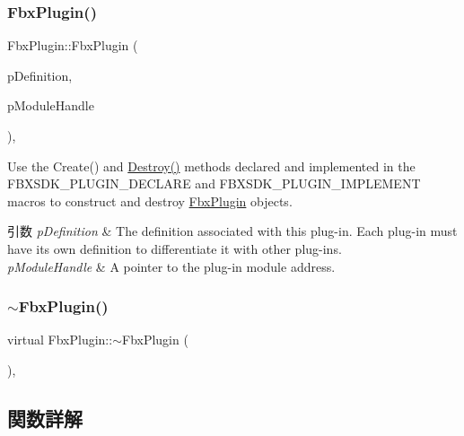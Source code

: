 \subsubsection{\texorpdfstring{Fbx\+Plugin()}{FbxPlugin()}}
{\footnotesize\ttfamily Fbx\+Plugin\+::\+Fbx\+Plugin (\begin{DoxyParamCaption}\item[{const \hyperlink{struct_fbx_plugin_def}{Fbx\+Plugin\+Def} \&}]{p\+Definition,  }\item[{\hyperlink{fbxmodule_8h_a1d2ed3e9ccb8075d585f7cb7bdf40420}{Fbx\+Module}}]{p\+Module\+Handle }\end{DoxyParamCaption})\hspace{0.3cm}{\ttfamily [explicit]}, {\ttfamily [protected]}}

Use the Create() and \hyperlink{class_fbx_plugin_a0a3b33c932cc862e539cef85d168b86a}{Destroy()} methods declared and implemented in the F\+B\+X\+S\+D\+K\+\_\+\+P\+L\+U\+G\+I\+N\+\_\+\+D\+E\+C\+L\+A\+RE and F\+B\+X\+S\+D\+K\+\_\+\+P\+L\+U\+G\+I\+N\+\_\+\+I\+M\+P\+L\+E\+M\+E\+NT macros to construct and destroy \hyperlink{class_fbx_plugin}{Fbx\+Plugin} objects. 
\begin{DoxyParams}{引数}
{\em p\+Definition} & The definition associated with this plug-\/in. Each plug-\/in must have its own definition to differentiate it with other plug-\/ins. \\
\hline
{\em p\+Module\+Handle} & A pointer to the plug-\/in module address. \\
\hline
\end{DoxyParams}
\mbox{\label{class_fbx_plugin_ae1d45c36d20e8174fdfe3985a9e0e2d3}} 
\subsubsection{\texorpdfstring{$\sim$\+Fbx\+Plugin()}{~FbxPlugin()}}
{\footnotesize\ttfamily virtual Fbx\+Plugin\+::$\sim$\+Fbx\+Plugin (\begin{DoxyParamCaption}{ }\end{DoxyParamCaption})\hspace{0.3cm}{\ttfamily [protected]}, {\ttfamily [virtual]}}



\subsection{関数詳解}
\mbox{\label{class_fbx_plugin_aafd653e6999de489d8e1c00fa9956ed0}} 
